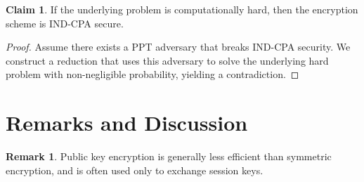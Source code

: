 \documentclass[11pt]{article}
\theoremstyle{definition}
\newtheorem{claim}{Claim}[section]
\newtheorem{remark}{Remark}[section]
\theoremstyle{proof}
\begin{document}
\begin{claim}
If the underlying problem is computationally hard, then the encryption scheme
is IND-CPA secure.
\end{claim}

\begin{proof}
Assume there exists a PPT adversary that breaks IND-CPA security.
We construct a reduction that uses this adversary to solve the underlying
hard problem with non-negligible probability, yielding a contradiction.
\end{proof}

\section{Remarks and Discussion}

\begin{remark}
Public key encryption is generally less efficient than symmetric encryption,
and is often used only to exchange session keys.
\end{remark}
\end{document}
